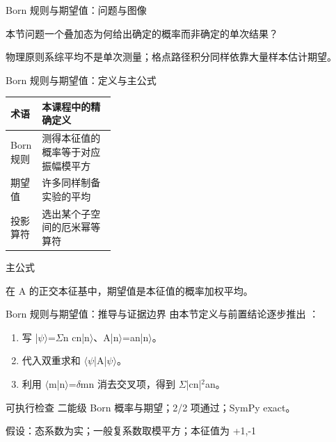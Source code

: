 \begin{frame}[t]{Born 规则与期望值：问题与图像}
\footnotesize
\begin{block}{本节问题}一个叠加态为何给出确定的概率而非确定的单次结果？\end{block}
\begin{block}{物理原则}\quad 系综平均不是单次测量；格点路径积分同样依靠大量样本估计期望。\end{block}
\end{frame}

\begin{frame}[t]{Born 规则与期望值：定义与主公式}
\footnotesize\begin{tabularx}{\linewidth}{p{0.30\linewidth}Y}
\toprule 术语 & 本课程中的精确定义\\\midrule
{} Born 规则 & 测得本征值的概率等于对应振幅模平方\\
 期望值 & 许多同样制备实验的平均\\
 投影算符 & 选出某个子空间的厄米幂等算符\\
\bottomrule\end{tabularx}\vspace{0.15cm}
\begin{block}{ 主公式}\centering{}\end{block}
在 A 的正交本征基中，期望值是本征值的概率加权平均。
\end{frame}

\begin{frame}[t]{Born 规则与期望值：推导与证据边界}
\footnotesize
{}\quad 由本节定义与前置结论逐步推出 ：
\begin{enumerate}
\item 写 |\ensuremath{\psi}\ensuremath{\rangle}=\ensuremath{\Sigma}n cn|n\ensuremath{\rangle}、A|n\ensuremath{\rangle}=an|n\ensuremath{\rangle}。
\item 代入双重求和 \ensuremath{\langle}\ensuremath{\psi}|A|\ensuremath{\psi}\ensuremath{\rangle}。
\item 利用 \ensuremath{\langle}m|n\ensuremath{\rangle}=\ensuremath{\delta}mn 消去交叉项，得到 \ensuremath{\Sigma}|cn|\ensuremath{^{2}}an。
\end{enumerate}\begin{block}{可执行检查}
\quad 二能级 Born 概率与期望；2/2 项通过；SymPy exact。
\par\scriptsize 假设：态系数为实；一般复系数取模平方；本征值为 +1,-1
\end{block}
\end{frame}

